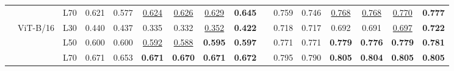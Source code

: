 \begin{table}[t]
{\begin{tabular}{lll cccccc |c cccccc}
 &  & L70 & 0.621 & 0.577 & \underline{0.624} & \underline{0.626} & \underline{0.629} & \textbf{0.645} & & 0.759 & 0.746 & \underline{0.768} & \underline{0.768} & \underline{0.770} & \textbf{0.777} \\
\cmidrule(lr){2-16}
 & \multirow{3}{*}{ViT-B/16} & L30 & 0.440 & 0.437 & 0.335 & 0.332 & \underline{0.352} & \textbf{0.422} & & 0.718 & 0.717 & 0.692 & 0.691 & \underline{0.697} & \textbf{0.722} \\
 &  & L50 & 0.600 & 0.600 & \underline{0.592} & \underline{0.588} & \textbf{0.595} & \textbf{0.597} & & 0.771 & 0.771 & \textbf{0.779} & \textbf{0.776} & \textbf{0.779} & \textbf{0.781} \\
 &  & L70 & 0.671 & 0.653 & \textbf{0.671} & \textbf{0.670} & \textbf{0.671} & \textbf{0.672} & & 0.795 & 0.790 & \textbf{0.805} & \textbf{0.804} & \textbf{0.805} & \textbf{0.805} \\
\bottomrule
\end{tabular}%
} %
\end{table}
